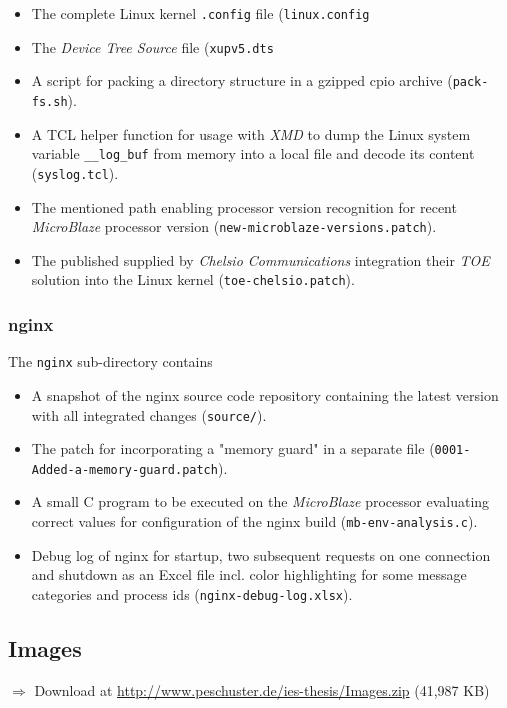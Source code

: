 \begin{itemize}
  \setlength{\itemsep}{1pt}
  \setlength{\parskip}{2pt}
  \setlength{\parsep}{2pt}
\item The complete Linux kernel \texttt{.config} file (\texttt{linux.config}
\item The \textit{Device Tree Source} file (\texttt{xupv5.dts}
\item A script for packing a directory structure in a gzipped cpio archive (\texttt{pack-fs.sh}).
\item A TCL helper function for usage with \textit{XMD} to dump the Linux system variable \texttt{\_\_log\_buf} from memory into a local file and decode its content (\texttt{syslog.tcl}).
\item The mentioned path enabling processor version recognition for recent \textit{MicroBlaze} processor version (\texttt{new-microblaze-versions.patch}).
\item The published supplied by \textit{Chelsio Communications} integration their \textit{TOE} solution into the Linux kernel (\texttt{toe-chelsio.patch}).
\end{itemize}

\subsubsection{nginx}
\label{appendix:memguard}

The \texttt{nginx} sub-directory contains 

\begin{itemize}
  \setlength{\itemsep}{1pt}
  \setlength{\parskip}{2pt}
  \setlength{\parsep}{2pt}
\item A snapshot of the nginx source code repository containing the latest version with all integrated changes (\texttt{source/}).
\item The patch for incorporating a "memory guard" in a separate file (\texttt{0001-Added-a-memory-guard.patch}).
\item A small C program to be executed on the \textit{MicroBlaze} processor evaluating correct values for configuration of the nginx build (\texttt{mb-env-analysis.c}).
\item Debug log of nginx for startup, two subsequent requests on one connection and shutdown as an Excel file incl. color highlighting for some message categories and process ids (\texttt{nginx-debug-log.xlsx}).
\end{itemize}

\subsection{Images}
$\Rightarrow$ Download at \url{http://www.peschuster.de/ies-thesis/Images.zip} (41,987 KB)

